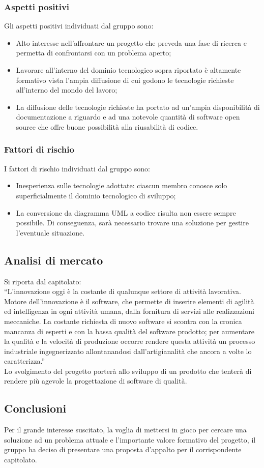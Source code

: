 \documentclass[../StudioDiFattibilita.tex]{subfiles}
\begin{document}
			\subsubsection{Aspetti positivi}
				Gli aspetti positivi individuati dal gruppo sono:
				\begin{itemize}
					\item Alto interesse nell'affrontare un progetto che preveda una fase di ricerca e permetta
					di confrontarsi con un problema aperto;
					\item Lavorare all'interno del dominio tecnologico sopra riportato è altamente formativo
					vista l'ampia diffusione di cui godono le tecnologie richieste all'interno del mondo del
					lavoro;
					\item La diffusione delle tecnologie richieste ha portato ad un'ampia disponibilità di
					documentazione a riguardo e ad una notevole quantità di software open source che offre buone
					possibilità alla riusabilità di codice.
				\end{itemize}
			\subsubsection{Fattori di rischio}
				I fattori di rischio individuati dal gruppo sono:
				\begin{itemize}
					\item Inesperienza sulle tecnologie adottate: ciascun membro conosce solo superficialmente il
					dominio tecnologico di sviluppo;
					\item La conversione da diagramma UML a codice risulta non essere sempre possibile.	Di
					conseguenza, sarà necessario trovare una soluzione per gestire l'eventuale situazione.
				\end{itemize}
		\subsection{Analisi di mercato}
			Si riporta dal capitolato:\\
			``L'innovazione oggi è la costante di qualunque settore di attività lavorativa. Motore
			dell'innovazione è il software, che permette di inserire elementi di agilità ed intelligenza in ogni
			attività umana, dalla fornitura di servizi alle realizzazioni meccaniche. La costante richiesta di
			nuovo software si scontra con la cronica mancanza di esperti e con la bassa qualità del software
			prodotto; per aumentare la qualità e la velocità di produzione occorre rendere questa attività un
			processo industriale ingegnerizzato allontanandosi dall'artigianalità che ancora a volte lo
			caratterizza.''\\
			Lo svolgimento del progetto porterà allo sviluppo di un prodotto che tenterà di rendere più agevole
			la progettazione di software di qualità.
		\subsection{Conclusioni}
			Per il grande interesse suscitato, la voglia di mettersi in gioco per cercare una soluzione ad un
			problema attuale e l'importante valore formativo del progetto, il gruppo ha deciso di presentare una
			proposta d'appalto per il corrispondente capitolato.
\end{document}
